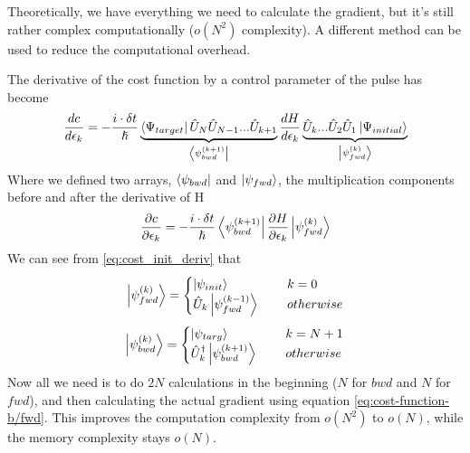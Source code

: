 Theoretically, we have everything we need to calculate the gradient, but it's still rather complex computationally ($o (N^2)$ complexity). A different method can be used to reduce the computational overhead.

The derivative of the cost function by a control parameter of the pulse has become
\begin{equation} \label{eq:cost_init_deriv}
    \frac{dc}{d\epsilon_k} = -\frac{i\cdot \delta t}{\hslash} \underbrace{\bra{\Psi_{target}}\hat{U}_N \hat{U}_{N-1}... \hat{U}_{k+1}}_{\bra{\psi_{bwd}^{ (k+1)}}}\frac{dH}{d\epsilon_k} \underbrace{\hat{U}_{k} ...\hat{U}_2 \hat{U}_1\ket{\Psi_{initial}}}_{\ket{\psi_{fwd}^{ (k)}}}
\end{equation}
Where we defined two arrays, $\bra{\psi_{bwd}}$ and $\ket{\psi_{fwd}}$, the multiplication components before and after the derivative of H
\begin{equation} \label{eq:cost-function-b/fwd}
    \frac{\partial c}{\partial \epsilon_k} =  -\frac{i\cdot \delta t}{\hslash}\bra{\psi_{bwd}^{ (k+1)}} \frac{\partial H}{\partial \epsilon_k} \ket{\psi_{fwd}^{ (k)}}
\end{equation}
We can see from \ref{eq:cost_init_deriv} that 
\[   
\ket{\psi_{fwd}^{ (k)}} = 
     \begin{cases}
       \ket{\psi_{init}} &\quad\ k=0\\
       \hat{U}_k \ket{\psi_{fwd}^{ (k-1)}} &\quad\ otherwise\\
     \end{cases}
\]
\[   
\ket{\psi_{bwd}^{ (k)}} = 
     \begin{cases}
       \ket{\psi_{targ}} &\quad\ k=N+1\\
       \hat{U}_k^{\dag{}} \ket{\psi_{bwd}^{ (k+1)}} &\quad\ otherwise\\
     \end{cases}
\]
Now all we need is to do $2N$ calculations in the beginning ($N$ for $bwd$ and $N$ for $fwd$), and then calculating the actual gradient using equation \ref{eq:cost-function-b/fwd}. This improves the computation complexity from $o (N^2)$ to $o (N)$, while the memory complexity stays $o (N)$.

